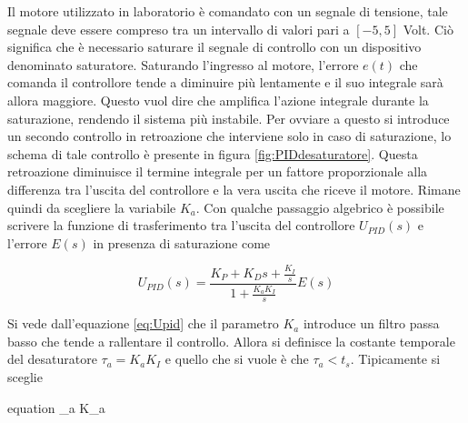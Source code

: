 		\noindent Il motore utilizzato in laboratorio è comandato con un segnale di tensione, tale segnale deve essere compreso tra un intervallo di valori pari a $[-5,5]$ Volt. Ciò significa che è necessario saturare il segnale di controllo con un dispositivo denominato saturatore. Saturando l'ingresso al motore, l'errore $e(t)$ che comanda il controllore tende a diminuire più lentamente e il suo integrale sarà allora maggiore. Questo vuol dire che amplifica l'azione integrale durante la saturazione, rendendo il sistema più instabile. Per ovviare a questo si introduce un secondo controllo in retroazione che interviene solo in caso di saturazione, lo schema di tale controllo è presente in figura \ref{fig:PIDdesaturatore}. Questa retroazione diminuisce il termine integrale per un fattore proporzionale alla differenza tra l'uscita del controllore e la vera uscita che riceve il motore. Rimane quindi da scegliere la variabile $K_a$. Con qualche passaggio algebrico è possibile scrivere la funzione di trasferimento tra l'uscita del controllore $U_{PID}(s)$ e l'errore $E(s)$ in presenza di saturazione come   
	
		\begin{equation}
			U_{PID}(s)=\frac{K_P+K_Ds+\frac{K_I}{s}}{1+\frac{K_aK_I}{s}}E(s)
			\label{eq:Upid}
		\end{equation}
	
		\noindent Si vede dall'equazione \ref{eq:Upid} che il parametro $K_a$ introduce un filtro passa basso che tende a rallentare il controllo. Allora si definisce la costante temporale del desaturatore $\tau_a=K_aK_I$ e quello che si vuole è che $\tau_a<t_s$. Tipicamente si sceglie
		
		\begin{empheq}[box=%
		\fbox]{equation}
			\tau_a \approx {} \trippleSpacing \Rightarrow \trippleSpacing K_a \approx {}
		\end{empheq}